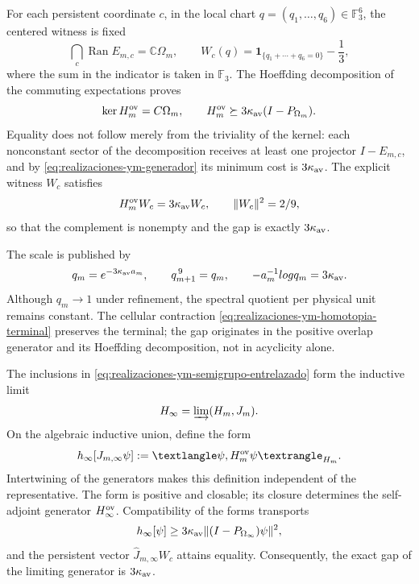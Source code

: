 For each persistent coordinate \(c\), in the local chart
\(q=(q_1,\ldots,q_6)\in\mathbb F_3^6\), the centered witness is fixed
\begin{equation}\label{eq:realizaciones-ym-testigo-definicion}
 \bigcap_c\operatorname{Ran}E_{m,c}=\mathbb C\Omega_m,
 \qquad
 W_c(q)=\mathbf 1_{\{q_1+\cdots+q_6=0\}}-\frac13,
\end{equation}
where the sum in the indicator is taken in \(\mathbb F_3\). The Hoeffding
decomposition of the commuting expectations proves
\begin{equation}\label{eq:realizaciones-ym-gap-finito}
 \ker\widehat H_m^{\rm ov}=\mathbb C\Omega_m,
 \qquad
 \widehat H_m^{\rm ov}\succeq
 3\kappa_{\rm av}(I-P_{\Omega_m}).
\end{equation}
Equality does not follow merely from the triviality of the kernel: each nonconstant
sector of the decomposition receives at least one projector
\(I-E_{m,c}\), and by \eqref{eq:realizaciones-ym-generador} its minimum cost
is \(3\kappa_{\rm av}\). The explicit witness \(W_c\) satisfies
\begin{equation}\label{eq:realizaciones-ym-testigo-gap}
 \widehat H_m^{\rm ov}W_c=3\kappa_{\rm av}W_c,
 \qquad \|W_c\|^2=\frac29,
\end{equation}
so that the complement is nonempty and the gap is exactly
\(3\kappa_{\rm av}\).

The scale is published by
\begin{equation}\label{eq:realizaciones-ym-qm}
 q_m=e^{-3\kappa_{\rm av}a_m},
 \qquad q_{m+1}^{\,9}=q_m,
 \qquad -a_m^{-1}\log q_m=3\kappa_{\rm av}.
\end{equation}
Although \(q_m\to1\) under refinement, the spectral quotient per physical unit
remains constant. The cellular contraction
\eqref{eq:realizaciones-ym-homotopia-terminal} preserves the terminal; the
gap originates in the positive overlap generator and its Hoeffding
decomposition, not in acyclicity alone.

The inclusions in \eqref{eq:realizaciones-ym-semigrupo-entrelazado}
form the inductive limit
\begin{equation}\label{eq:realizaciones-ym-colimite}
 \mathcal H_\infty=\varinjlim(\mathcal H_m,\widehat J_m).
\end{equation}
On the algebraic inductive union, define the form
\begin{equation}\label{eq:realizaciones-ym-forma-limite}
 \mathfrak h_\infty[\widehat J_{m,\infty}\psi]
 :=\langle\psi,\widehat H_m^{\rm ov}\psi\rangle_{\mathcal H_m}.
\end{equation}
Intertwining of the generators makes this definition
independent of the representative. The form is positive and closable; its
closure determines the self-adjoint generator \(\widehat H_\infty^{\rm ov}\).
Compatibility of the forms transports
\begin{equation}\label{eq:realizaciones-ym-gap-forma-limite}
 \overline{\mathfrak h}_\infty[\psi]
 \geq3\kappa_{\rm av}
 \|(I-P_{\Omega_\infty})\psi\|^2,
\end{equation}
and the persistent vector
\(\widehat J_{m,\infty}W_c\) attains equality. Consequently, the
exact gap of the limiting generator is \(3\kappa_{\rm av}\).

